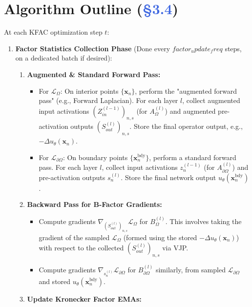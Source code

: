 \documentclass[12pt,a4paper]{article}
\newcommand{\vect}[1]{\mathbf{#1}} %
\begin{document}
\section{Algorithm Outline (\textcolor{RoyalBlue}{§3.4})}
\vspace{-3pt}
At each KFAC optimization step \(t\):
\begin{enumerate}[leftmargin=*,nosep]
\item \textbf{Factor Statistics Collection Phase} (Done every $factor_update_freq$ steps, on a dedicated batch if desired):
    \begin{enumerate}
        \item \textbf{Augmented \& Standard Forward Pass:}
            \begin{itemize}
                \item For \(\mathcal{L}_\Omega\): On interior points \(\{\vect{x}_n\}\), perform the "augmented forward pass" (e.g., Forward Laplacian). For each layer \(l\), collect augmented input activations \((Z_{in}^{(l-1)})_{n,s}\) (for \(A_\Omega^{(l)}\)) and augmented pre-activation outputs \((S_{out}^{(l)})_{n,s}\). Store the final operator output, e.g., \(-\Delta u_\theta(\vect{x}_n)\).
                \item For \(\mathcal{L}_{\partial\Omega}\): On boundary points \(\{\vect{x}_n^{\text{bdy}}\}\), perform a standard forward pass. For each layer \(l\), collect input activations \(z_n^{(l-1)}\) (for \(A_{\partial\Omega}^{(l)}\)) and pre-activation outputs \(s_n^{(l)}\). Store the final network output \(u_\theta(\vect{x}_n^{\text{bdy}})\).
            \end{itemize}
        \item \textbf{Backward Pass for B-Factor Gradients:}
            \begin{itemize}
                \item Compute gradients \(\nabla_{(S_{out}^{(l)})_{n,s}} \mathcal{L}_\Omega\) for \(B_\Omega^{(l)}\). This involves taking the gradient of the sampled \(\mathcal{L}_\Omega\) (formed using the stored \(-\Delta u_\theta(\vect{x}_n)\)) with respect to the collected \((S_{out}^{(l)})_{n,s}\) via VJP.
                \item Compute gradients \(\nabla_{s_n^{(l)}} \mathcal{L}_{\partial\Omega}\) for \(B_{\partial\Omega}^{(l)}\) similarly, from sampled \(\mathcal{L}_{\partial\Omega}\) and stored \(u_\theta(\vect{x}_n^{\text{bdy}})\).
            \end{itemize}
        \item \textbf{Update Kronecker Factor EMAs:}

\end{enumerate}
\end{enumerate}
\end{document}
